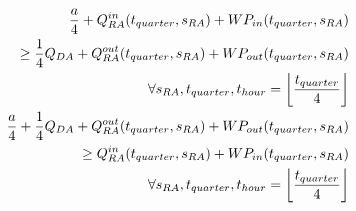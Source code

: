 \begin{alignat}{3}
	\frac{a}{4} + Q^{in}_{RA}(t_{quarter}, s_{RA}) +  WP_{in}(t_{quarter}, s_{RA}) \notag                                   \\
	\geq \frac{1}{4} Q_{DA}  + Q^{out}_{RA}(t_{quarter}, s_{RA}) + WP_{out}(t_{quarter}, s_{RA}) \notag                     \\
	\quad \forall s_{RA},  t_{quarter},  t_{hour} = \left\lfloor \frac{t_{quarter}}{4}\right\rfloor\label{eq:a_general_pos} \\
	\frac{a}{4} + \frac{1}{4}Q_{DA} +  Q^{out}_{RA}(t_{quarter}, s_{RA}) + WP_{out}(t_{quarter}, s_{RA}) \notag             \\
	\geq Q^{in}_{RA}(t_{quarter}, s_{RA}) +  WP_{in}(t_{quarter}, s_{RA}) \notag                                            \\
	\quad \forall s_{RA},  t_{quarter},  t_{hour} = \left\lfloor \frac{t_{quarter}}{4}\right\rfloor \label{eq:a_general_neg}
\end{alignat}

